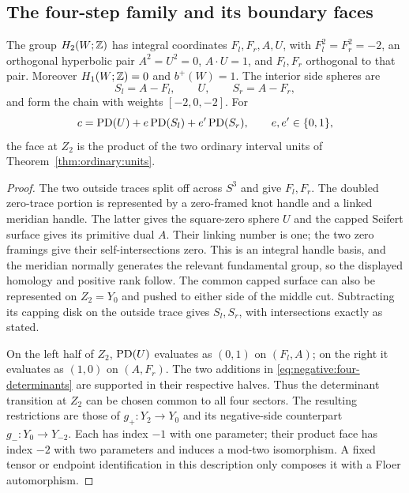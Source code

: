 \subsection{The four-step family and its boundary faces}

\begin{lemma}
\label{lem:negative:four-topology}
The group $H_2(W;\mathbb Z)$ has integral coordinates $F_l,F_r,A,U$, with
$F_l^2=F_r^2=-2$, an orthogonal hyperbolic pair
$A^2=U^2=0$, $A\cdot U=1$, and $F_l,F_r$ orthogonal to that pair.
Moreover $H_1(W;\mathbb Z)=0$ and $b^+(W)=1$.  The interior side spheres are
\[
 S_l=A-F_l,\qquad U,\qquad S_r=A-F_r,
\]
and form the chain with weights $[-2,0,-2]$.  For
\begin{equation}\label{eq:negative:four-determinants}
 c=\operatorname{PD}(U)+e\operatorname{PD}(S_l)+e'\operatorname{PD}(S_r),\qquad e,e'\in\{0,1\},
\end{equation}
the face at $Z_2$ is the product of the two ordinary interval units
of Theorem~\ref{thm:ordinary:units}.
\end{lemma}

\begin{proof}
The two outside traces split off across $S^3$ and give $F_l,F_r$.
The doubled zero-trace portion is represented by a zero-framed knot
handle and a linked meridian handle.  The latter gives the square-zero
sphere $U$ and the capped Seifert surface gives its primitive dual
$A$.  Their linking number is one; the two zero framings give their
self-intersections zero.  This is an integral handle basis, and the
meridian normally generates the relevant fundamental group, so the
displayed homology and positive rank follow.  The common capped
surface can also be represented on $Z_2=Y_0$ and pushed to either
side of the middle cut.  Subtracting its capping disk on the outside
trace gives $S_l,S_r$, with intersections exactly as stated.

On the left half of $Z_2$, $\operatorname{PD}(U)$ evaluates as $(0,1)$ on
$(F_l,A)$; on the right it evaluates as $(1,0)$ on $(A,F_r)$.
The two additions in \eqref{eq:negative:four-determinants} are supported
in their respective halves.  Thus the determinant transition at $Z_2$
can be chosen common to all four sectors.  The resulting restrictions
are those of $g_+:Y_2\to Y_0$ and its negative-side counterpart
$g_-:Y_0\to Y_{-2}$.  Each has index $-1$ with one parameter;
their product face has index $-2$ with two parameters and induces a
mod-two isomorphism.  A fixed tensor or endpoint identification in
this description only composes it with a Floer automorphism.
\end{proof}

